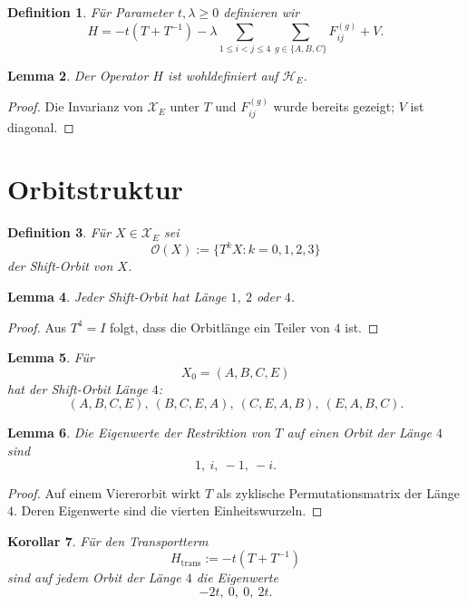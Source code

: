 \documentclass[11pt,a4paper]{article}
\newtheorem{definition}{Definition}[section]
\newtheorem{lemma}[definition]{Lemma}
\newtheorem{corollary}[definition]{Korollar}
\theoremstyle{remark}
\newcommand{\XE}{\mathcal X_E}
\newcommand{\HE}{\mathcal H_E}
\begin{document}
	\begin{definition}
		Für Parameter \(t,\lambda\ge 0\) definieren wir
		\[
		H
		=
		-t(T+T^{-1})
		-\lambda\sum_{1\le i<j\le 4}\sum_{g\in\{A,B,C\}}F_{ij}^{(g)}
		+V.
		\]
	\end{definition}
	
	\begin{lemma}
		Der Operator \(H\) ist wohldefiniert auf \(\HE\).
	\end{lemma}
	
	\begin{proof}
		Die Invarianz von \(\XE\) unter \(T\) und \(F_{ij}^{(g)}\) wurde bereits gezeigt; \(V\) ist diagonal.
	\end{proof}
	
	\section{Orbitstruktur}
	
	\begin{definition}
		Für \(X\in \XE\) sei
		\[
		\mathcal O(X):=\{T^kX: k=0,1,2,3\}
		\]
		der Shift-Orbit von \(X\).
	\end{definition}
	
	\begin{lemma}
		Jeder Shift-Orbit hat Länge \(1\), \(2\) oder \(4\).
	\end{lemma}
	
	\begin{proof}
		Aus \(T^4=I\) folgt, dass die Orbitlänge ein Teiler von \(4\) ist.
	\end{proof}
	
	\begin{lemma}
		Für
		\[
		X_0=(A,B,C,E)
		\]
		hat der Shift-Orbit Länge \(4\):
		\[
		(A,B,C,E),\ (B,C,E,A),\ (C,E,A,B),\ (E,A,B,C).
		\]
	\end{lemma}
	
	\begin{lemma}
		Die Eigenwerte der Restriktion von \(T\) auf einen Orbit der Länge \(4\) sind
		\[
		1,\ i,\ -1,\ -i.
		\]
	\end{lemma}
	
	\begin{proof}
		Auf einem Viererorbit wirkt \(T\) als zyklische Permutationsmatrix der Länge \(4\). Deren Eigenwerte sind die vierten Einheitswurzeln.
	\end{proof}
	
	\begin{corollary}
		Für den Transportterm
		\[
		H_{\mathrm{trans}}:=-t(T+T^{-1})
		\]
		sind auf jedem Orbit der Länge \(4\) die Eigenwerte
		\[
		-2t,\ 0,\ 0,\ 2t.
		\]
	\end{corollary}
	
\end{document}
